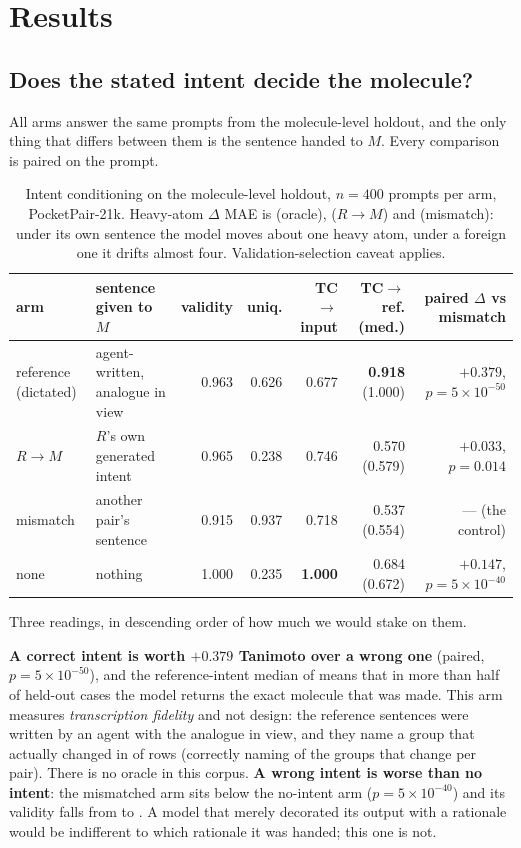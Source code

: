 \section{Results}

\subsection{Does the stated intent decide the molecule?}
\label{sec:intent}

All arms answer the same  prompts from the molecule-level holdout, and the only thing that
differs between them is the sentence handed to $M$. Every comparison is paired on the prompt.

\begin{table}[H]\centering\small
\begin{tabular}{llrrrrr}
\toprule
arm & sentence given to $M$ & validity & uniq. & TC$\rightarrow$input & TC$\rightarrow$ref. (med.) & paired $\Delta$ vs mismatch \\
\midrule
reference (dictated) & agent-written, analogue in view & 0.963 & 0.626 & 0.677 & \textbf{0.918} (1.000) & $+0.379$, $p=5\!\times\!10^{-50}$ \\
$R\!\rightarrow\!M$ & $R$'s own generated intent & 0.965 & 0.238 & 0.746 & 0.570 (0.579) & $+0.033$, $p=0.014$ \\
mismatch & another pair's sentence & 0.915 & 0.937 & 0.718 & 0.537 (0.554) & --- (the control) \\
none & nothing & 1.000 & 0.235 & \textbf{1.000} & 0.684 (0.672) & $+0.147$, $p=5\!\times\!10^{-40}$ \\
\bottomrule
\end{tabular}
\caption{Intent conditioning on the molecule-level holdout, $n=400$ prompts per arm, PocketPair-21k.
Heavy-atom $\Delta$ MAE is  (oracle),  ($R\!\rightarrow\!M$) and 
(mismatch): under its own sentence the model moves about one heavy atom, under a foreign one it
drifts almost four. Validation-selection caveat applies.}
\label{tab:arms}
\end{table}

Three readings, in descending order of how much we would stake on them.

\textbf{A correct intent is worth $+0.379$ Tanimoto over a wrong one} (paired,
$p=5\times10^{-50}$), and the reference-intent median of  means that in more than half of
held-out cases the model returns the exact molecule that was made. This arm measures
\emph{transcription fidelity} and not design: the reference sentences were written by an agent with
the analogue in view, and they name a group that actually changed in  of rows (correctly
naming  of the  groups that change per pair). There is no oracle in this corpus. \textbf{A wrong intent is worse than
no intent}: the mismatched arm sits  below the no-intent arm ($p=5\times10^{-40}$) and its
validity falls from  to . A model that merely decorated its output with a
rationale would be indifferent to which rationale it was handed; this one is not.


